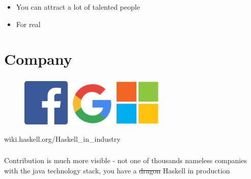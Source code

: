 \documentclass[usenames,dvipsnames, 18pt, compress, aspectratio=169]{beamer}
\begin{document}
\begin{frame}
    \frametitle{}
    \begin{itemize}
        \item<+-> You can attract a lot of talented people
        \item<+-> For real
    \end{itemize}
\end{frame}

\fontsize{13pt}{14}\selectfont
\section{Company}
\fontsize{17pt}{18}\selectfont

\begin{frame}
    \frametitle{}
    \begin{center}
    \begin{figure}
        \includegraphics[width=0.2\textwidth]{fb.png}\hspace{0.1\textwidth}
        \includegraphics[width=0.2\textwidth]{google.png}\hspace{0.1\textwidth}
        \includegraphics[width=0.2\textwidth]{microsoft.png}
    \end{figure}

    \vspace{1cm}
    wiki.haskell.org/Haskell\_in\_industry
    \end{center}
\end{frame}

\begin{frame}
    \frametitle{}
    \begin{flushleft}
    Contribution is much more visible - not one of thousands nameless
    companies with the java technology stack, you have a \sout{dragon} Haskell in
    production
    \end{flushleft}
\end{frame}
\end{document}
